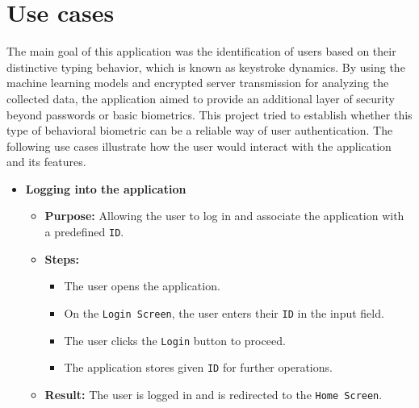 
\section{Use cases}
The main goal of this application was the identification of users based on their distinctive typing behavior, which is known as keystroke dynamics. By using the machine learning models and encrypted server transmission for analyzing the collected data, the application aimed to provide an additional layer of security beyond passwords or basic biometrics. This project tried to establish whether this type of behavioral biometric can be a reliable way of user authentication. \newline
The following use cases illustrate how the user would interact with the application and its features.

\begin{itemize}
	\item \textbf{Logging into the application}
	\begin{itemize}
		\item \textbf{Purpose:} Allowing the user to log in and associate the application with a predefined \texttt{ID}.
		\item \textbf{Steps:}
		\begin{itemize}
			\item The user opens the application.
			\item On the \texttt{Login Screen}, the user enters their \texttt{ID} in the input field.
			\item The user clicks the \texttt{Login} button to proceed.
			\item The application stores given \texttt{ID} for further operations.
		\end{itemize}
		\item \textbf{Result:} The user is logged in and is redirected to the \texttt{Home Screen}.
	\end{itemize}
	

\end{itemize}
